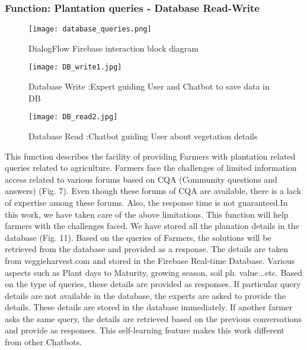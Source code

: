 \documentclass[10pt,conference]{IEEEtran}
\begin{document}
	\subsubsection{ Function: Plantation queries - Database Read-Write }



\begin{figure}[h]
 \centering
   \texttt{[image: database\_queries.png]}
  \caption{DialogFlow Firebase interaction block diagram }
\end{figure}

\begin{figure}
 \centering
   \texttt{[image: DB\_write1.jpg]}
  \caption{Database Write :Expert guiding User and Chatbot to save data in DB }
\end{figure}


\begin{figure}
 \centering
   \texttt{[image: DB\_read2.jpg]}
  \caption{Database Read :Chatbot guiding User about vegetation details}
\end{figure}



{\raggedright

This function describes the facility of providing Farmers with plantation related queries related to agriculture. Farmers face the challenges of limited information access related to various forums based on CQA (Community questions and answers) (Fig. 7). Even though these forums of CQA are available, there is a lack of expertise among these forums. Also, the response time is not guaranteed.In this work, we have taken care of the above limitations. This function will help farmers with the challenges faced. We have stored all the planation details in the database (Fig. 11). Based on the queries of Farmers, the solutions will be retrieved from the database and provided as a response. The details are taken from veggieharvest.com and stored in the Firebase Real-time Database. Various aspects such as Plant days to Maturity, growing season, soil ph. value...etc. Based on the type of queries, these details are provided as responses. If particular query details are not available in the database, the experts are asked to provide the details. These details are stored in the database immediately. If another farmer asks the same query, the details are retrieved based on the previous conversations and provide as responses. This self-learning feature makes this work different from other Chatbots.
}
\end{document}
